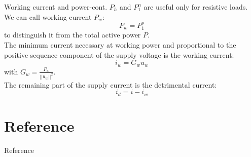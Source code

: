 \documentclass[aspectratio=169]{beamer}
\begin{document}
  \begin{frame}{Working current and power-cont.}{\insertsection}
    $P_h$ and $P_1^n$ are useful only for resistive loads. We can call \textcolor{NTNU_orange}{working current $P_w$}:
    \begin{equation}
      P_w = P_{1}^{p} 
    \end{equation}  
    to distinguish it from the total active power $P$.\\
    The minimum current necessary at working power and proportional to the positive sequence component of the supply voltage is the \textcolor{NTNU_orange}{working current}:
    \begin{equation}
      \pmb{\mathit{i}}_w = G_w \pmb{\mathit{u}}_w
    \end{equation}
    with $G_w=\frac{P_w}{||\pmb{\mathit{u}}_w||^2}$.\\
    The remaining part of the supply current is the \textcolor{NTNU_orange}{detrimental current}:
    \begin{equation}
      \pmb{\mathit{i}}_d = \pmb{\mathit{i}} - \pmb{\mathit{i}}_w
    \end{equation}
  \end{frame}


    \section{Reference}
    \begin{frame}{Reference}
        \nocite{*}
        \printbibliography
    \end{frame}

    \maketitle
\end{document}
